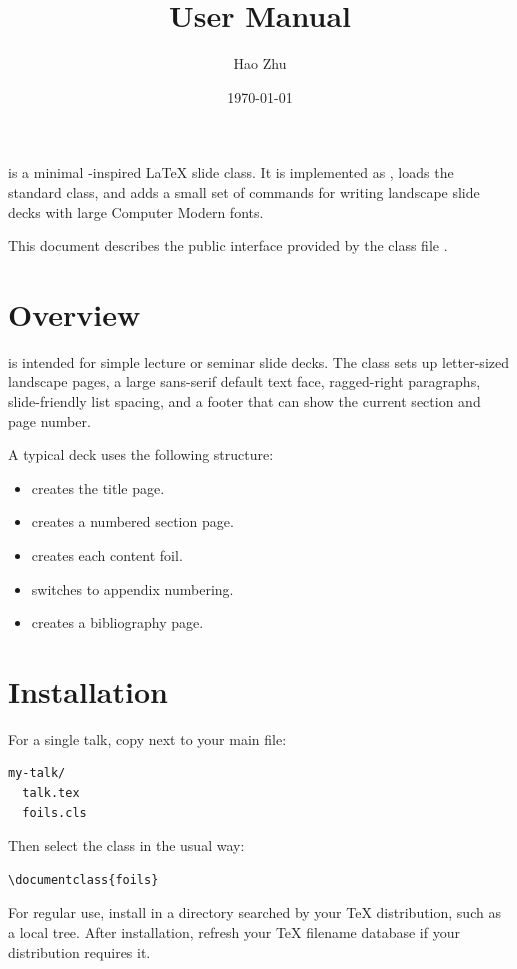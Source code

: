 \documentclass{article}
\title{\pkg{foils} User Manual}
\author{Hao Zhu}
\date{\today}
\begin{document}
\maketitle

 is a minimal -inspired LaTeX slide class.
It is implemented as , loads the standard  class, and adds a small set of commands for writing landscape slide decks with large Computer Modern fonts.

This document describes the public interface provided by the class file .

\section{Overview}
 is intended for simple lecture or seminar slide decks.
The class sets up letter-sized landscape pages, a large sans-serif default text face, ragged-right paragraphs, slide-friendly list spacing, and a footer that can show the current section and page number.

A typical deck uses the following structure:
\begin{itemize}
  \item {} creates the title page.
  \item {} creates a numbered section page.
  \item {} creates each content foil.
  \item {} switches to appendix numbering.
  \item {} creates a bibliography page.
\end{itemize}

\section{Installation}
For a single talk, copy  next to your main  file:
\begin{verbatim}
my-talk/
  talk.tex
  foils.cls
\end{verbatim}

Then select the class in the usual way:
\begin{verbatim}
\documentclass{foils}
\end{verbatim}

For regular use, install  in a directory searched by your TeX distribution, such as a local  tree.
After installation, refresh your TeX filename database if your distribution requires it.
\end{document}
